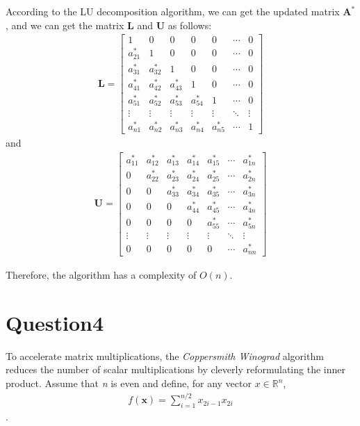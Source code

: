 \documentclass{article}
\newcommand{\R}{\mathbb{R}}
\begin{document}
According to the LU decomposition algorithm, we can get the updated matrix \(\bm{A^*}\), and we can get the matrix \(\bm{L}\) and \(\bm{U}\) as follows:
\begin{align*}
    \bm{L} = \begin{bmatrix}
        1 & 0 & 0 & 0 & 0 & \cdots & 0 \\
        a_{21}^* & 1 & 0 & 0 & 0 & \cdots & 0 \\
        a_{31}^* & a_{32}^* & 1 & 0 & 0 & \cdots & 0 \\
        a_{41}^* & a_{42}^* & a_{43}^* & 1 & 0 & \cdots & 0 \\
        a_{51}^* & a_{52}^* & a_{53}^* & a_{54}^* & 1 & \cdots & 0 \\
        \vdots & \vdots & \vdots & \vdots & \vdots & \ddots & \vdots \\
        a_{n1}^* & a_{n2}^* & a_{n3}^* & a_{n4}^* & a_{n5}^* & \cdots & 1
    \end{bmatrix}
\end{align*}
and 
\begin{align*}
    \bm{U} = 
    \begin{bmatrix}
        a_{11}^* & a_{12}^* & a_{13}^* & a_{14}^* & a_{15}^* & \cdots & a_{1n}^* \\
        0 & a_{22}^* & a_{23}^* & a_{24}^* & a_{25}^* & \cdots & a_{2n}^* \\
        0 & 0 & a_{33}^* & a_{34}^* & a_{35}^* & \cdots & a_{3n}^* \\
        0 & 0 & 0 & a_{44}^* & a_{45}^* & \cdots & a_{4n}^* \\
        0 & 0 & 0 & 0 & a_{55}^* & \cdots & a_{5n}^* \\
        \vdots & \vdots & \vdots & \vdots & \vdots & \ddots & \vdots \\
        0 & 0 & 0 & 0 & 0 & \cdots & a_{nn}^* 
    \end{bmatrix}
\end{align*}

Therefore, the algorithm has a complexity of \(O(n)\).

\section*{Question4}
To accelerate matrix multiplications, the \textit{Coppersmith Winograd} algorithm reduces the number of scalar multiplications by cleverly reformulating
the inner product. Assume that \textit{n} is even and define, for any vector \(x \in \R^n\),
\begin{align*}
    f(\bm{x}) = \sum_{i = 1}^{n / 2} x_{2i - 1} x_{2i}
\end{align*}.
\end{document}
